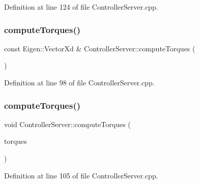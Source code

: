 Definition at line 124 of file Controller\+Server.\+cpp.

\hypertarget{classocra__recipes_1_1ControllerServer_a4b4c825748bc85f200f4b82cbffb8e0d}{}\label{classocra__recipes_1_1ControllerServer_a4b4c825748bc85f200f4b82cbffb8e0d} 
\subsubsection{\texorpdfstring{compute\+Torques()}{computeTorques()}\hspace{0.1cm}{\footnotesize\ttfamily [1/2]}}
{\footnotesize\ttfamily const Eigen\+::\+Vector\+Xd \& Controller\+Server\+::compute\+Torques (\begin{DoxyParamCaption}{ }\end{DoxyParamCaption})}



Definition at line 98 of file Controller\+Server.\+cpp.

\hypertarget{classocra__recipes_1_1ControllerServer_a925d4de1de73f0ac18e50f0f3c4cd0a4}{}\label{classocra__recipes_1_1ControllerServer_a925d4de1de73f0ac18e50f0f3c4cd0a4} 
\subsubsection{\texorpdfstring{compute\+Torques()}{computeTorques()}\hspace{0.1cm}{\footnotesize\ttfamily [2/2]}}
{\footnotesize\ttfamily void Controller\+Server\+::compute\+Torques (\begin{DoxyParamCaption}\item[{Eigen\+::\+Vector\+Xd \&}]{torques }\end{DoxyParamCaption})}



Definition at line 105 of file Controller\+Server.\+cpp.

\hypertarget{classocra__recipes_1_1ControllerServer_a40bc86b6d9a4140441320c88bfc77652}{}\label{classocra__recipes_1_1ControllerServer_a40bc86b6d9a4140441320c88bfc77652} 
